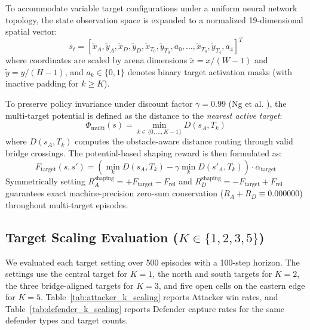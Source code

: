 \documentclass[conference]{IEEEtran}
\begin{document}
To accommodate variable target configurations under a uniform neural network topology, the state observation space is expanded to a normalized 19-dimensional spatial vector:
\begin{equation}
s_t = \left[ \tilde{x}_A, \tilde{y}_A, \tilde{x}_D, \tilde{y}_D, \tilde{x}_{T_0}, \tilde{y}_{T_0}, a_0, \dots, \tilde{x}_{T_4}, \tilde{y}_{T_4}, a_4 \right]^T
\end{equation}
where coordinates are scaled by arena dimensions $\tilde{x} = x / (W-1)$ and $\tilde{y} = y / (H-1)$, and $a_k \in \{0, 1\}$ denotes binary target activation masks (with inactive padding for $k \ge K$).

To preserve policy invariance under discount factor $\gamma = 0.99$ (Ng et al. \cite{ng1999policy}), the multi-target potential is defined as the distance to the \textit{nearest active target}:
\begin{equation}
\Phi_{\text{multi}}(s) = \min_{k \in \{0, \dots, K-1\}} D(s_A, T_k)
\end{equation}
where $D(s_A, T_k)$ computes the obstacle-aware distance routing through valid bridge crossings. The potential-based shaping reward is then formulated as:
\begin{equation}
F_{\text{target}}(s, s') = \left( \min_{k} D(s_A, T_k) - \gamma \min_{k} D(s'_A, T_k) \right) \cdot \alpha_{\text{target}}
\end{equation}
Symmetrically setting $R_A^{\text{shaping}} = +F_{\text{target}} - F_{\text{rel}}$ and $R_D^{\text{shaping}} = -F_{\text{target}} + F_{\text{rel}}$ guarantees exact machine-precision zero-sum conservation ($R_A + R_D \equiv 0.000000$) throughout multi-target episodes.

\subsection{Target Scaling Evaluation ($K \in \{1, 2, 3, 5\}$)}
We evaluated each target setting over 500 episodes with a 100-step horizon. The settings use the central target for $K=1$, the north and south targets for $K=2$, the three bridge-aligned targets for $K=3$, and five open cells on the eastern edge for $K=5$. Table~\ref{tab:attacker_k_scaling} reports Attacker win rates, and Table~\ref{tab:defender_k_scaling} reports Defender capture rates for the same defender types and target counts.
\end{document}
